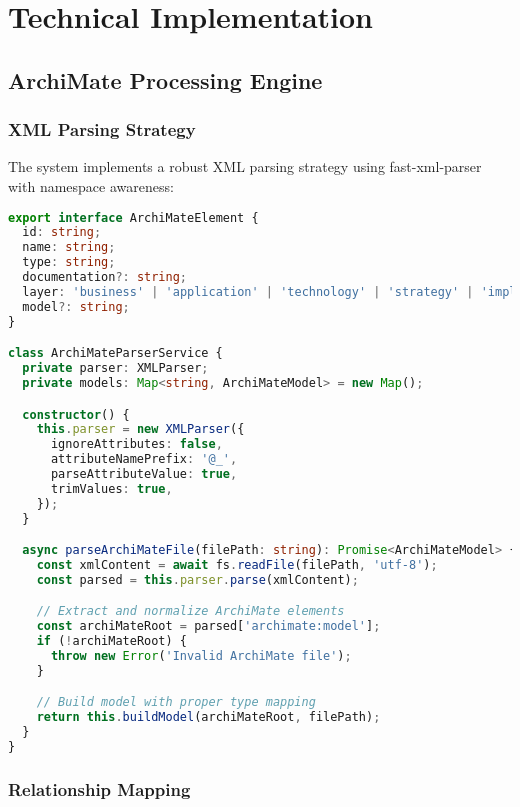 \documentclass[12pt,a4paper]{report}
\begin{document}
\chapter{Technical Implementation}

\section{ArchiMate Processing Engine}

\subsection{XML Parsing Strategy}

The system implements a robust XML parsing strategy using fast-xml-parser with namespace awareness:

\begin{lstlisting}[language=TypeScript, caption=ArchiMate Parser Configuration]
export interface ArchiMateElement {
  id: string;
  name: string;
  type: string;
  documentation?: string;
  layer: 'business' | 'application' | 'technology' | 'strategy' | 'implementation';
  model?: string;
}

class ArchiMateParserService {
  private parser: XMLParser;
  private models: Map<string, ArchiMateModel> = new Map();

  constructor() {
    this.parser = new XMLParser({
      ignoreAttributes: false,
      attributeNamePrefix: '@_',
      parseAttributeValue: true,
      trimValues: true,
    });
  }

  async parseArchiMateFile(filePath: string): Promise<ArchiMateModel> {
    const xmlContent = await fs.readFile(filePath, 'utf-8');
    const parsed = this.parser.parse(xmlContent);

    // Extract and normalize ArchiMate elements
    const archiMateRoot = parsed['archimate:model'];
    if (!archiMateRoot) {
      throw new Error('Invalid ArchiMate file');
    }

    // Build model with proper type mapping
    return this.buildModel(archiMateRoot, filePath);
  }
}
\end{lstlisting}

\subsection{Relationship Mapping}
\end{document}
